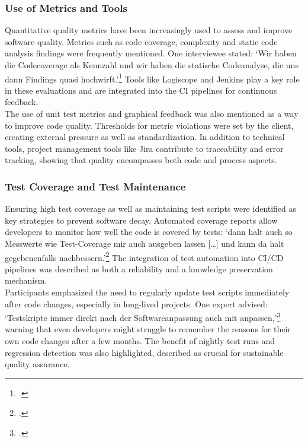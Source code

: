 \subsubsection{Use of Metrics and Tools}
Quantitative quality metrics have been increasingly used to assess and improve software quality. Metrics such as code coverage, complexity and static code analysis findings were frequently mentioned. One interviewee stated: `Wir haben die Codecoverage als Kennzahl und wir haben die statische Codeanalyse,
die uns dann Findings quasi hochwirft.'\footcite{Interview32025} Tools like Logiscope and Jenkins play a key role in these evaluations and are integrated into the CI pipelines for continuous feedback.\\
The use of unit test metrics and graphical feedback was also mentioned as a way to improve code quality. Thresholds for metric violations were set by the client, creating external pressure as well as standardization. In addition to technical tools, project management tools like Jira contribute to traceability and error tracking,
showing that quality encompasses both code and process aspects.\\

\subsubsection{Test Coverage and Test Maintenance}
Ensuring high test coverage as well as maintaining test scripts were identified as key strategies to prevent software decay. Automated coverage reports allow developers to monitor how well the code is covered by tests: `dann halt auch so Messwerte wie Test-Coverage mir auch ausgeben lassen [\ldots] und kann da halt gegebenenfalls nachbessern.'\footcite{Interview32025}
The integration of test automation into CI/CD pipelines was described as both a reliability and a knowledge preservation mechanism.\\
Participants emphasized the need to regularly update test scripts immediately after code changes, especially in long-lived projects. One expert advised: `Testskripte immer direkt nach der Softwareanpassung auch mit anpassen,'\footcite{Interview12025} warning that even developers might struggle to remember the reasons for their own code changes after a few months.
The benefit of nightly test runs and regression detection was also highlighted, described as crucial for sustainable quality assurance.\\

